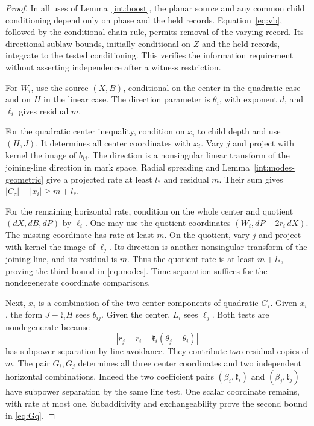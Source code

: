 \begin{proof}
In all uses of Lemma~\ref{int:boost}, the planar source and
any common child conditioning depend only on phase and the
held records. Equation~\eqref{eq:vb}, followed by the
conditional chain rule, permits removal of the varying
record. Its directional sublaw bounds, initially conditional
on $Z$ and the held records, integrate to the tested
conditioning. This verifies the information requirement
without asserting independence after a witness restriction.

For $W_i$, use the source $(X,B)$, conditional on the center
in the quadratic case and on $H$ in the linear case.
The direction parameter is $\theta_i$, with exponent $d$,
and $\ell_i$ gives residual $m$.

For the quadratic center inequality, condition on $x_i$
to child depth and use $(H,J)$. It determines all center
coordinates with $x_i$. Vary $j$ and project with kernel
the image of $b_{ij}$. The direction is a nonsingular
linear transform of the joining-line direction in mark
space. Radial spreading and Lemma~\ref{int:modes-geometric}
give a projected rate at least $l_*$ and residual $m$.
Their sum gives $|C_z|-|x_i|\geq m+l_*$.

For the remaining horizontal rate, condition on the whole
center and quotient $(dX,dB,dP)$ by $\ell_i$. One may use
the quotient coordinates $(W_i,dP-2r_i\,dX)$. The missing
coordinate has rate at least $m$. On the quotient, vary
$j$ and project with kernel the image of $\ell_j$. Its
direction is another nonsingular transform of the joining
line, and its residual is $m$. Thus the quotient rate is
at least $m+l_*$, proving the third bound in
\eqref{eq:modes}. Time separation suffices for the
nondegenerate coordinate comparisons.

Next, $x_i$ is a combination of the two center components
of quadratic $G_i$. Given $x_i$, the form $J-\mathfrak k_iH$
sees $b_{ij}$. Given the center, $L_i$ sees $\ell_j$.
Both tests are nondegenerate because
\[
 |r_j-r_i-\mathfrak k_i(\theta_j-\theta_i)|
\]
has subpower separation by line avoidance. They contribute
two residual copies of $m$. The pair $G_i,G_j$ determines
all three center coordinates and two independent horizontal
combinations. Indeed the two coefficient pairs
$(\beta_i,\mathfrak k_i)$ and $(\beta_j,\mathfrak k_j)$ have
subpower separation by the same line test. One scalar
coordinate remains, with rate at most one. Subadditivity
and exchangeability prove the second bound in
\eqref{eq:Gq}.


\end{proof}
